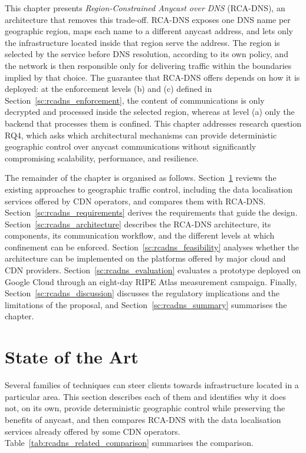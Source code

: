This chapter presents \textit{Region-Constrained Anycast over DNS} (RCA-DNS), an architecture that removes this trade-off. RCA-DNS exposes one DNS name per geographic region, maps each name to a different anycast address, and lets only the infrastructure located inside that region serve the address. The region is selected by the service before DNS resolution, according to its own policy, and the network is then responsible only for delivering traffic within the boundaries implied by that choice. The guarantee that RCA-DNS offers depends on how it is deployed: at the enforcement levels (b) and (c) defined in Section~\ref{sc:rcadns_enforcement}, the content of communications is only decrypted and processed inside the selected region, whereas at level (a) only the backend that processes them is confined. This chapter addresses research question RQ4, which asks which architectural mechanisms can provide deterministic geographic control over anycast communications without significantly compromising scalability, performance, and resilience.

The remainder of the chapter is organised as follows. Section~\ref{sc:rcadns_related} reviews the existing approaches to geographic traffic control, including the data localisation services offered by CDN operators, and compares them with RCA-DNS. Section~\ref{sc:rcadns_requirements} derives the requirements that guide the design. Section~\ref{sc:rcadns_architecture} describes the RCA-DNS architecture, its components, its communication workflow, and the different levels at which confinement can be enforced. Section~\ref{sc:rcadns_feasibility} analyses whether the architecture can be implemented on the platforms offered by major cloud and CDN providers. Section~\ref{sc:rcadns_evaluation} evaluates a prototype deployed on Google Cloud through an eight-day RIPE Atlas measurement campaign. Finally, Section~\ref{sc:rcadns_discussion} discusses the regulatory implications and the limitations of the proposal, and Section~\ref{sc:rcadns_summary} summarises the chapter.

\section{State of the Art}
\label{sc:rcadns_related}

Several families of techniques can steer clients towards infrastructure located in a particular area. This section describes each of them and identifies why it does not, on its own, provide deterministic geographic control while preserving the benefits of anycast, and then compares RCA-DNS with the data localisation services already offered by some CDN operators. Table~\ref{tab:rcadns_related_comparison} summarises the comparison.

